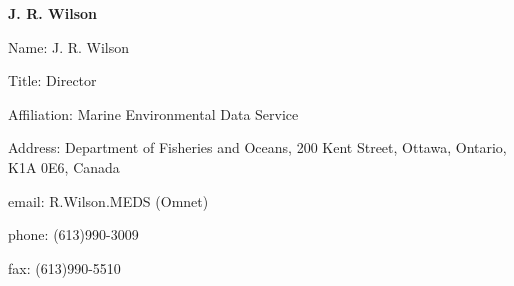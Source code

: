 \begin{center}
\LARGE
{\bf  J. R. Wilson}
\end{center}
\large
{}
\normalsize
\smallskip
\begin{description}
\item{Name:}  J. R. Wilson
\item{Title:}  Director
\item{Affiliation:}  Marine Environmental Data Service
\item{Address:}  Department of Fisheries and Oceans, 200 Kent Street, 
Ottawa, Ontario, K1A   0E6, Canada
\item{email:}  R.Wilson.MEDS (Omnet)
\item{phone:}  (613)990-3009
\item{fax:}  (613)990-5510
\end{description}
\medskip
\large
{}
\normalsize
\medskip
